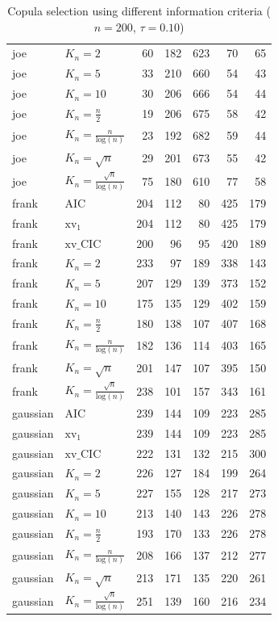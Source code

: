 \begin{table}[htbp]
\begin{tabular}{llrrrrr}
  joe & $K_{n}=2$ & 60 & 182 & 623 & 70 & 65 \\ 
  joe & $K_{n}=5$ & 33 & 210 & 660 & 54 & 43 \\ 
  joe & $K_{n}=10$ & 30 & 206 & 666 & 54 & 44 \\ 
  joe & $K_{n}=\tfrac{n}{2}$ & 19 & 206 & 675 & 58 & 42 \\ 
  joe & $K_{n}=\tfrac{n}{\text{log}(n)}$ & 23 & 192 & 682 & 59 & 44 \\ 
  joe & $K_{n}=\sqrt{n}$ & 29 & 201 & 673 & 55 & 42 \\ 
  joe & $K_{n}=\tfrac{\sqrt{n}}{\text{log}(n)}$ & 75 & 180 & 610 & 77 & 58 \\ 
   \hdashline
frank & AIC & 204 & 112 & 80 & 425 & 179 \\ 
  frank & $\text{xv}_{1}$ & 204 & 112 & 80 & 425 & 179 \\ 
  frank & $\text{xv}\_\text{CIC}$ & 200 & 96 & 95 & 420 & 189 \\ 
  frank & $K_{n}=2$ & 233 & 97 & 189 & 338 & 143 \\ 
  frank & $K_{n}=5$ & 207 & 129 & 139 & 373 & 152 \\ 
  frank & $K_{n}=10$ & 175 & 135 & 129 & 402 & 159 \\ 
  frank & $K_{n}=\tfrac{n}{2}$ & 180 & 138 & 107 & 407 & 168 \\ 
  frank & $K_{n}=\tfrac{n}{\text{log}(n)}$ & 182 & 136 & 114 & 403 & 165 \\ 
  frank & $K_{n}=\sqrt{n}$ & 201 & 147 & 107 & 395 & 150 \\ 
  frank & $K_{n}=\tfrac{\sqrt{n}}{\text{log}(n)}$ & 238 & 101 & 157 & 343 & 161 \\ 
   \hdashline
gaussian & AIC & 239 & 144 & 109 & 223 & 285 \\ 
  gaussian & $\text{xv}_{1}$ & 239 & 144 & 109 & 223 & 285 \\ 
  gaussian & $\text{xv}\_\text{CIC}$ & 222 & 131 & 132 & 215 & 300 \\ 
  gaussian & $K_{n}=2$ & 226 & 127 & 184 & 199 & 264 \\ 
  gaussian & $K_{n}=5$ & 227 & 155 & 128 & 217 & 273 \\ 
  gaussian & $K_{n}=10$ & 213 & 140 & 143 & 226 & 278 \\ 
  gaussian & $K_{n}=\tfrac{n}{2}$ & 193 & 170 & 133 & 226 & 278 \\ 
  gaussian & $K_{n}=\tfrac{n}{\text{log}(n)}$ & 208 & 166 & 137 & 212 & 277 \\ 
  gaussian & $K_{n}=\sqrt{n}$ & 213 & 171 & 135 & 220 & 261 \\ 
  gaussian & $K_{n}=\tfrac{\sqrt{n}}{\text{log}(n)}$ & 251 & 139 & 160 & 216 & 234 \\ 
   \hline
\end{tabular}
\caption{Copula selection using different information criteria ($n = 200$, $\tau = 0.10$)} 
\end{table}



